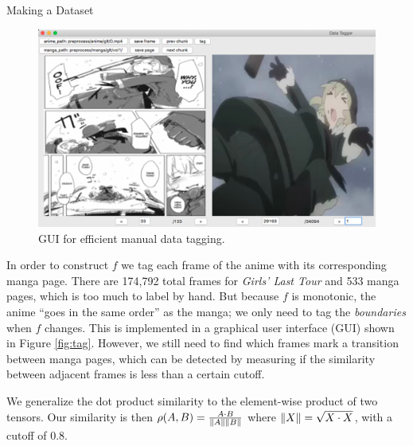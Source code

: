 \documentclass{beamer}                             %
\begin{document}
\begin{frame}
\begin{columns}
    \begin{column}{0.33\textwidth}
      \begin{block}{Making a Dataset}
        \setlength{\parindent}{1em}
        \begin{figure}
          \centering
          \includegraphics[scale=0.4]{data_tagger}
          \caption{GUI for efficient manual data tagging.}
          \label{fig:tag}
        \end{figure}

        In order to construct \( f \) we tag each frame of the anime with
        its corresponding manga page. There are 174,792 total frames for
        \textit{Girls' Last Tour} and 533 manga pages, which is too much
        to label by hand. But because \( f \) is monotonic, the anime
        \enquote{goes in the same order} as the manga; we only need to tag
        the \textit{boundaries} when \( f \) changes. This is implemented in
        a graphical user interface (GUI) shown in Figure \autoref{fig:tag}.
        However, we still need to find which frames mark a transition between
        manga pages, which can be detected by measuring if the similarity
        between adjacent frames is less than a certain cutoff.

        We generalize the dot product similarity to the element-wise
        product of two tensors. Our similarity is then \( \rho(A, B)
        = \frac{A \cdot B}{\norm{A} \norm{B}} \) where \( \norm{X} =
        \sqrt{X \cdot X} \), with a cutoff of 0.8.
      \end{block}


\end{column}
\end{columns}
\end{frame}
\end{document}
